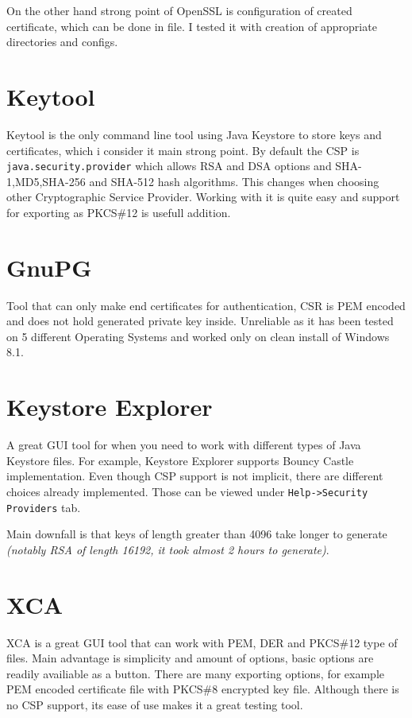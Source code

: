 \documentclass[10pt, a4paper]{report}
\begin{document}
On the other hand strong point of OpenSSL is configuration of created certificate, which can be done in file. I tested it with creation of appropriate directories and configs.

\section{Keytool}
Keytool is the only command line tool using Java Keystore to store keys and certificates, which i consider it main strong point. By default the CSP is \verb+java.security.provider+ which allows RSA and DSA options and SHA-1,MD5,SHA-256 and SHA-512 hash algorithms. This changes when choosing other Cryptographic Service Provider. Working with it is quite easy and support for exporting as PKCS\#12 is usefull addition.

\section{GnuPG}
Tool that can only make end certificates for authentication, CSR is PEM encoded and does not hold generated private key inside. Unreliable as it has been tested on 5 different Operating Systems and worked only on clean install of Windows 8.1.

\section{Keystore Explorer}
A great GUI tool for when you need to work with different types of Java Keystore files. For example, Keystore Explorer supports Bouncy Castle implementation. Even though CSP support is not implicit, there are different choices already implemented. Those can be viewed under \verb+Help->Security Providers+ tab.

Main downfall is that keys of length greater than 4096 take longer to generate \textit{(notably RSA of length 16192, it took almost 2 hours to generate)}.

\section{XCA}
XCA is a great GUI tool that can work with PEM, DER and PKCS\#12 type of files. Main advantage is simplicity and amount of options, basic options are readily availiable as a button. There are many exporting options, for example PEM encoded certificate file with PKCS\#8 encrypted key file. Although there is no CSP support, its ease of use makes it a great testing tool.
\end{document}
